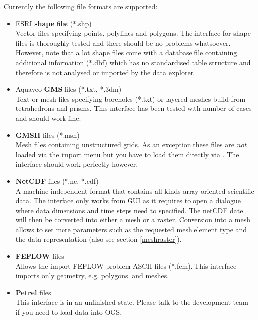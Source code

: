 Currently the following file formats are supported:
\begin{itemize}
\item ESRI \textbf{shape} files (*.shp)\\
Vector files specifying points, polylines and polygons. The interface for shape files is thoroughly tested and there should be no problems whatsoever. However, note that a lot shape files come with a database file containing additional information (*.dbf) which has no standardised table structure and therefore is not analysed or imported by the data explorer.
\item Aquaveo \textbf{GMS} files (*.txt, *.3dm)\\
Text or mesh files specifying boreholes (*.txt) or layered meshes build from tetrahedrons and prisms. This interface has been tested with number of cases and should work fine.
\item \textbf{GMSH} files (*.msh)\\
Mesh files containing unstructured grids. As an exception these files are \emph{not} loaded via the import menu but you have to load them directly via . The interface should work perfectly however.
\item \textbf{NetCDF} files (*.nc, *.cdf)\\
A machine-independent format that contains all kinds array-oriented scientific data. The interface only works from GUI as it requires to open a dialogue where data dimensions and time steps need to specified. The netCDF date will then be converted into either a mesh or a raster. Conversion into a mesh allows to set more parameters such as the requested mesh element type and the data representation (also see section \ref{meshraster}).
\item \textbf{FEFLOW} files\\
Allows the import FEFLOW problem ASCII files (*.fem). This interface imports only geometry, e.g. polygons, and meshes.
\item \textbf{Petrel} files\\
This interface is in an unfinished state. Please talk to the development team if you need to load data into OGS.

\end{itemize}
